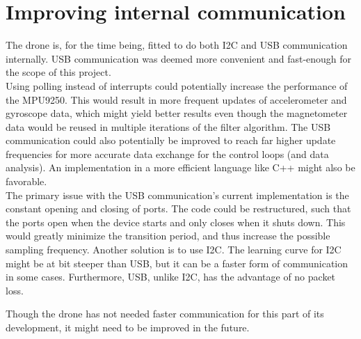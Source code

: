 \section{Improving internal communication}\label{sec:communicationimprove}
The drone is, for the time being, fitted to do both I2C and USB communication internally. USB communication was deemed more convenient and fast-enough for the scope of this project.\\
Using polling instead of interrupts could potentially increase the performance of the MPU9250. This would result in more frequent updates of accelerometer and gyroscope data, which might yield better results even though the magnetometer data would be reused in multiple iterations of the filter algorithm. The USB communication could also potentially be improved to reach far higher update frequencies for more accurate data exchange for the control loops (and data analysis). An implementation in a more efficient language like C++ might also be favorable. \\
The primary issue with the USB communication's current implementation is the constant opening and closing of ports. The code could be restructured, such that the ports open when the device starts and only closes when it shuts down. This would greatly minimize the transition period, and thus increase the possible sampling frequency. Another solution is to use I2C. The learning curve for I2C might be at bit steeper than USB, but it can be a faster form of communication in some cases. Furthermore, USB, unlike I2C, has the advantage of no packet loss. 



Though the drone has not needed faster communication for this part of its development, it might need to be improved in the future. 


